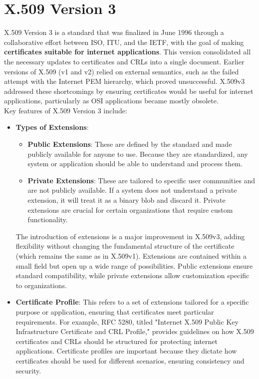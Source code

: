 \section{X.509 Version 3}

X.509 Version 3 is a standard that was finalized in June 1996 through
a collaborative effort between ISO, ITU, and the IETF, with the goal
of making \textbf{certificates suitable for internet applications}.
This version consolidated all the necessary updates to certificates
and CRLs into a single document. Earlier versions of X.509 (v1 and v2)
relied on external semantics, such as the failed attempt with the
Internet PEM hierarchy, which proved unsuccessful. X.509v3 addressed
these shortcomings by ensuring certificates would be useful for
internet applications, particularly as OSI applications became mostly
obsolete.\\
Key features of X.509 Version 3 include:

\begin{itemize}
  \item \textbf{Types of Extensions}:
    \begin{itemize}
      \item \textbf{Public Extensions}: These are defined by the
        standard and made publicly available for anyone to use.
        Because they are standardized, any system or application
        should be able to understand and process them.
      \item \textbf{Private Extensions}: These are tailored to
        specific user communities and are not publicly available. If a
        system does not understand a private extension, it will treat
        it as a binary blob and discard it. Private extensions are
        crucial for certain organizations that require custom
        functionality.
    \end{itemize}
    
    The introduction of extensions is a major improvement in X.509v3,
    adding flexibility without changing the fundamental structure of
    the certificate (which remains the same as in X.509v1). Extensions
    are contained within a small field but open up a wide range of
    possibilities. Public extensions ensure standard compatibility,
    while private extensions allow customization specific to
    organizations.

  \item \textbf{Certificate Profile}: This refers to a set of
    extensions tailored for a specific purpose or application,
    ensuring that certificates meet particular requirements. For
    example, RFC 5280, titled "Internet X.509 Public Key
    Infrastructure Certificate and CRL Profile," provides guidelines
    on how X.509 certificates and CRLs should be structured for
    protecting internet applications. Certificate profiles are
    important because they dictate how certificates should be used for
    different scenarios, ensuring consistency and security.
\end{itemize}


